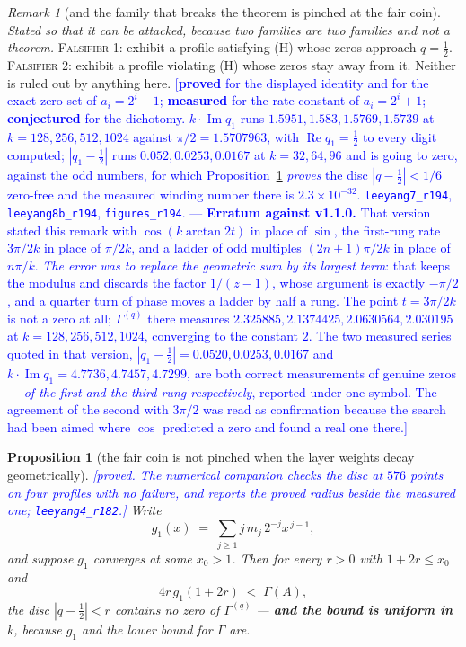 \documentclass[11pt,a4paper]{article}
\theoremstyle{plain}
\newtheorem{proposition}[theorem]{Proposition}
\theoremstyle{definition}
\theoremstyle{remark}
\newtheorem{remark}[theorem]{Remark}
\newcommand{\STATUS}[1]{\textcolor{blue}{\textsf{[#1]}}}
\begin{document}
\begin{remark}[and the family that breaks the theorem is pinched at the fair coin]
\emph{Stated so that it can be attacked, because two families are two families and not a
theorem.} \textsc{Falsifier 1}: exhibit a profile satisfying \textup{(H)} whose zeros approach
$q=\tfrac12$. \textsc{Falsifier 2}: exhibit a profile violating \textup{(H)} whose zeros stay
away from it. Neither is ruled out by anything here.
\STATUS{\textbf{proved} for the displayed identity and for the exact zero set of $a_i=2^{i}-1$;
\textbf{measured} for the rate constant of $a_i=2^{i}+1$; \textbf{conjectured} for the dichotomy.
$k\cdot\operatorname{Im}q_{1}$ runs $1.5951, 1.583, 1.5769, 1.5739$ at $k=128,256,512,1024$
against $\pi/2=1.5707963$, with $\operatorname{Re}q_1=\tfrac12$ to every digit computed;
$|q_1-\tfrac12|$ runs $0.052, 0.0253, 0.0167$ at $k=32,64,96$ and is going to zero, against the
odd numbers, for which Proposition~\ref{prop:nopinch} \emph{proves} the disc $|q-\tfrac12|<1/6$
zero-free and the measured winding number there is $2.3\times10^{-32}$.
\texttt{leeyang7\_r194}, \texttt{leeyang8b\_r194}, \texttt{figures\_r194}.
 \;--- \textbf{Erratum against v1.1.0.} That version stated this remark with
$\cos(k\arctan2t)$ in place of $\sin$, the first-rung rate $3\pi/2k$ in place of $\pi/2k$, and a
ladder of odd multiples $(2n+1)\pi/2k$ in place of $n\pi/k$. \emph{The error was to replace the
geometric sum by its largest term}: that keeps the modulus and discards the factor $1/(z-1)$,
whose argument is exactly $-\pi/2$, and a quarter turn of phase moves a ladder by half a rung.
The point $t=3\pi/2k$ is not a zero at all; $\Gamma^{(q)}$ there measures $2.325885, 2.1374425,
2.0630564, 2.030195$ at $k=128,256,512,1024$, converging to the constant $2$. The two measured
series quoted in that version, $|q_1-\tfrac12|=0.0520,0.0253,0.0167$ and
$k\cdot\operatorname{Im}q_1=4.7736,4.7457,4.7299$, are both correct measurements of genuine
zeros --- \emph{of the first and the third rung respectively}, reported under one symbol. The
agreement of the second with $3\pi/2$ was read as confirmation because the search had been aimed
where $\cos$ predicted a zero and found a real one there.}
\end{remark}

\begin{proposition}[the fair coin is not pinched when the layer weights decay geometrically]
\label{prop:nopinch}
\STATUS{proved. The numerical companion checks the disc at $576$ points on four profiles with no
failure, and reports the proved radius beside the measured one; \texttt{leeyang4\_r182}.}
Write
\[
  g_1(x)\;=\;\sum_{j\ge1}j\,m_j\,2^{-j}x^{\,j-1},
\]
and suppose $g_1$ converges at some $x_0>1$. Then for every $r>0$ with $1+2r\le x_0$ and
\[
  4r\,g_1(1+2r)\;<\;\Gamma(A),
\]
the disc $|q-\tfrac12|<r$ contains no zero of $\Gamma^{(q)}$ --- \textbf{and the bound is uniform
in $k$}, because $g_1$ and the lower bound for $\Gamma$ are.
\end{proposition}
\end{document}
